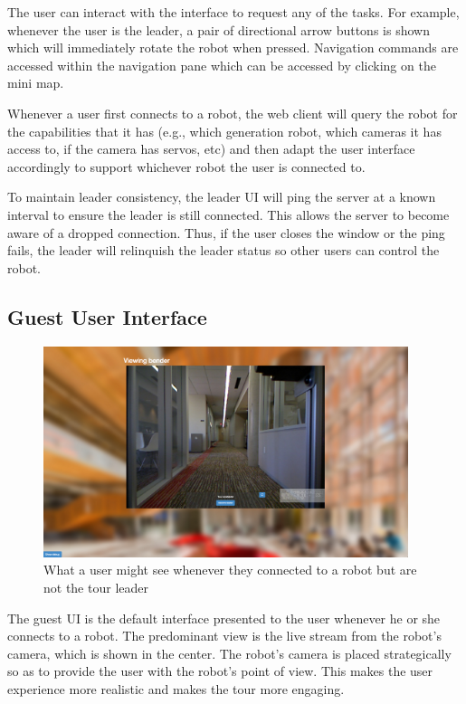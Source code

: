 \documentclass[
  oneside,
  11pt, a4paper,
  footinclude=true,
  headinclude=true,
  cleardoublepage=empty
]{article}
\begin{document}
The user can interact with the interface to request any of the tasks. For
example, whenever the user is the leader, a pair of directional arrow buttons
is shown which will immediately rotate the robot when pressed. Navigation
commands are accessed within the navigation pane which can be accessed by
clicking on the mini map.

Whenever a user first connects to a robot, the web client will query the robot
for the capabilities that it has (e.g., which generation robot, which cameras it
has access to, if the camera has servos, etc) and then adapt the user
interface accordingly to support whichever robot the user is connected to.

To maintain leader consistency, the leader UI will ping the server at
a known interval to ensure the leader is still connected. This allows the
server to become aware of a dropped connection. Thus, if the user closes the window
or the ping fails, the leader will relinquish the leader status so other users
can control the robot.


\subsection{Guest User Interface}

\begin{figure}
  \centering
  \includegraphics[width=0.95\textwidth]{guestUI}
  \caption{What a user might see whenever they connected to a robot but are not
  the tour leader}
  \label{fig:guest_mode}
\end{figure}

The guest UI is the default interface presented to the user whenever he or she
connects to a robot. The predominant view is the live stream from the robot's
camera, which is shown in the center. The robot's camera is placed
strategically so as to provide the user with the robot's point of view. This
makes the user experience more realistic and makes the tour more engaging.
\end{document}
